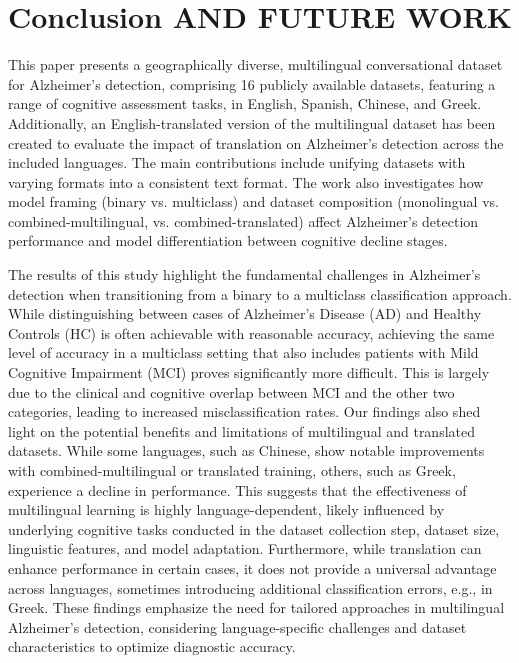 \balance
\section{Conclusion AND FUTURE WORK}
\label{sec:concl}


This paper presents a geographically diverse, multilingual conversational dataset for Alzheimer's detection, comprising 16 publicly available datasets, featuring a range of cognitive assessment tasks, in English, Spanish, Chinese, and Greek. Additionally, an English-translated version of the multilingual dataset has been created to evaluate the impact of translation on Alzheimer's detection across the included languages. The main contributions include unifying datasets with varying formats into a consistent text format. The work also investigates how model framing (binary vs. multiclass) and dataset composition (monolingual vs. combined-multilingual, vs. combined-translated) affect Alzheimer’s detection performance and model differentiation between cognitive decline stages.



The results of this study highlight the fundamental challenges in Alzheimer’s detection when transitioning from a binary to a multiclass classification approach. While distinguishing between
cases of Alzheimer’s Disease (AD) and Healthy Controls (HC) is often achievable with reasonable accuracy, achieving the same level of accuracy in a multiclass setting that also includes patients with Mild Cognitive Impairment (MCI) proves significantly more difficult. This is largely due to the clinical and cognitive overlap between MCI and the other two categories, leading to increased misclassification rates. Our findings also shed light on the potential benefits and limitations of multilingual and translated datasets. While some languages, such as Chinese, show notable improvements with combined-multilingual or translated training, others, such as Greek, experience a decline in performance. This suggests that the effectiveness of multilingual learning is highly language-dependent, likely influenced by underlying cognitive tasks conducted in the dataset collection step, dataset size, linguistic features, and model adaptation. Furthermore, while translation can enhance performance in certain cases, it does not provide a universal advantage across languages, sometimes introducing additional classification errors, e.g., in Greek. These findings emphasize the need for tailored approaches in multilingual Alzheimer’s detection, considering language-specific challenges and dataset characteristics to optimize diagnostic accuracy.





